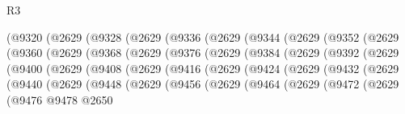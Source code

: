 \begin{lexlean}{R3}
\begin{coremodule}
            (@9320
              (@2629
                (@9328
                  (@2629
                    (@9336
                      (@2629
                        (@9344
                          (@2629
                            (@9352
                              (@2629
                                (@9360
                                  (@2629
                                    (@9368
                                      (@2629
                                        (@9376
                                          (@2629
                                            (@9384
                                              (@2629
                                                (@9392
                                                  (@2629
                                                    (@9400
                                                      (@2629
                                                        (@9408
                                                          (@2629
                                                            (@9416
                                                              (@2629
                                                                (@9424
                                                                  (@2629
                                                                    (@9432
                                                                      (@2629
                                                                        (@9440
                                                                          (@2629
                                                                            (@9448
                                                                              (@2629
                                                                                (@9456
                                                                                  (@2629
                                                                                    (@9464
                                                                                      (@2629
                                                                                        (@9472
                                                                                          (@2629
                                                                                            (@9476
                                                                                              @9478
                                                                                              @2650

\end{coremodule}
\end{lexlean}

